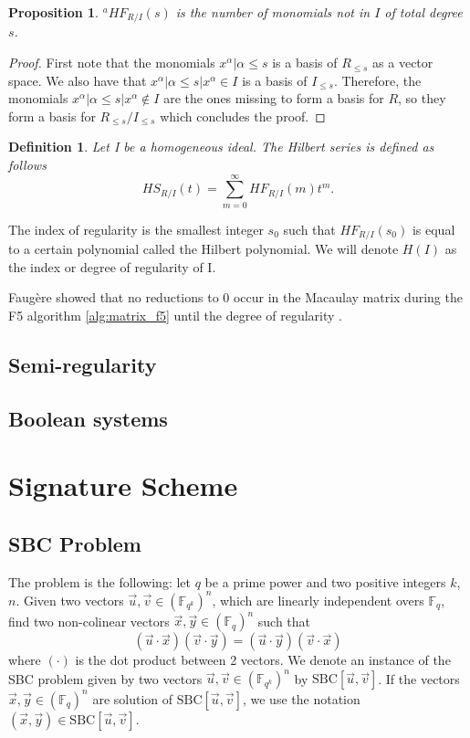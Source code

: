 \documentclass[english]{article}
\newtheorem{proposition}{Proposition}[section]
\newtheorem{definition}{Definition}[section]
\begin{document}
		\begin{proposition}
			${}^a HF_{R/I}(s)$ is the number of monomials not in $I$ of total degree $s$.
		\end{proposition}
		\begin{proof}
			First note that the monomials ${x^\alpha | \alpha \leq s}$ is a basis of $R_{\leq s}$ as a vector space. We also have that ${x^\alpha | \alpha \leq s | x^\alpha \in I}$ is a basis of $I_{\leq s}$. Therefore, the monomials ${x^\alpha | \alpha \leq s | x^\alpha \notin I}$ are the ones missing to form a basis for $R$, so they form a basis for $R_{\leq s} / I_{\leq s}$ which concludes the proof.
		\end{proof}
		
		\begin{definition}
			Let I be a homogeneous ideal. The Hilbert series is defined as follows
			$$
					HS_{R/I}(t) = \sum_{m=0}^{\infty} HF_{R/I}(m) t^m.
			$$	
		\end{definition}
		
		The index of regularity is the smallest integer $s_0$ such that $HF_{R/I}(s_0)$ is equal to a certain polynomial called the Hilbert polynomial. We will denote $H(I)$ as the index or degree of regularity of I.
		
		Faugère showed that no reductions to 0 occur in the Macaulay matrix during the F5 algorithm \ref{alg:matrix_f5} until the degree of regularity \cite{F02}.
		
		\subsection{Semi-regularity}
		
		\subsection{Boolean systems}
		
	\section{Signature Scheme}
		\subsection{SBC Problem}
		The problem is the following: let $q$ be a prime power and two positive integers $k$, $n$.
		\newline
		Given two vectors $\vec{u}, \vec{v} \in (\mathbb{F}_{q^k})^n$, which are linearly independent overs $\mathbb{F}_q$, find two non-colinear vectors $\vec{x}, \vec{y} \in (\mathbb{F}_q)^n$ such that $$(\vec{u} \cdot \vec{x})(\vec{v} \cdot \vec{y}) = (\vec{u} \cdot \vec{y})(\vec{v} \cdot \vec{x})$$
		where $(\cdot)$ is the dot product between 2 vectors.
		We denote an instance of the SBC problem given by two vectors $\vec{u}, \vec{v} \in (\mathbb{F}_{q^k})^n$ by $\text{SBC}[\vec{u}, \vec{v}]$. If the vectors $\vec{x},\vec{y} \in (\mathbb{F}_q)^n$ are solution of $\text{SBC}[\vec{u},\vec{v}]$, we use the notation $(\vec{x}, \vec{y}) \in \text{SBC}[\vec{u}, \vec{v}]$.
		
\end{document}
